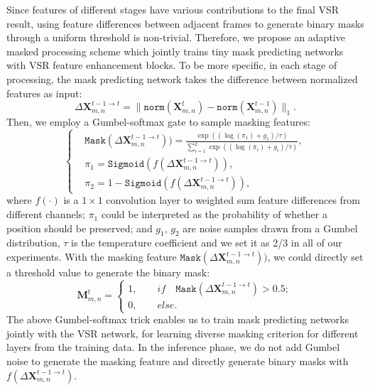 \documentclass[10pt,twocolumn,letterpaper]{article}
\begin{document}
Since features of different stages have various contributions to the final VSR result, using
feature differences between adjacent frames to generate binary masks through a uniform threshold is non-trivial.
%
Therefore, we propose an adaptive masked processing scheme which jointly trains tiny mask predicting networks with VSR feature enhancement blocks.
%
To be more specific, in each stage of processing, the mask predicting network takes  the difference between normalized features as input:
\begin{equation}\label{eq:mask}
    \Delta \bm{X}_{m,n}^{t-1\to t} = \|\texttt{norm}(\bm{X}^t_{m,n}) - \texttt{norm}(\bm{X}^{t-1}_{m,n})\|_1.
\end{equation}
Then, we employ  a Gumbel-softmax \cite{jang2016categorical} gate to sample masking features:
\begin{equation}
\left\{
    \begin{aligned}
    &\texttt{Mask}(\Delta \bm{X}_{m,n}^{t-1\to t}))=\frac{\exp \left(\left(\log \left(\pi_1\right)+g_1\right) / \tau\right)}{\sum_{i=1}^{2} \exp \left(\left(\log \left(\pi_i\right)+g_{i}\right) / \tau\right)},\\
    &\pi_1 = \texttt{Sigmoid}(f(\Delta \bm{X}_{m,n}^{t-1\to t})), \\
    &\pi_2 = 1-\texttt{Sigmoid}(f(\Delta \bm{X}_{m,n}^{t-1\to t})),
    \end{aligned}
    \right.
\end{equation}
where $f(\cdot)$ is a $1\times1$ convolution layer to weighted sum feature differences from different channels;
%
$\pi_1$ could be interpreted as the probability of whether a position should be preserved;
and  $g_1$, $g_2$ are noise samples drawn from a Gumbel distribution, $\tau$ 
 is the temperature coefficient and we set it as 2/3 in all of our experiments.
%
 With the masking feature $\texttt{Mask}(\Delta \bm{X}_{m,n}^{t-1\to t}))$, we could directly set a threshold value to generate the binary mask:
 \begin{equation}\label{eq:mask}
    \bm{M}_{m,n}^t = 
    \left\{
        \begin{array}{l}
        1,\quad\quad if \quad \texttt{Mask}(\Delta \bm{X}_{m,n}^{t-1\to t}) > 0.5; \\
        0,\quad\quad else.
        \end{array}
        \right.
\end{equation}
The above Gumbel-softmax trick enables us to train mask predicting networks jointly with the 
VSR network, 
for learning diverse masking criterion for different layers from the training data.
%
In the inference phase, we do not add Gumbel noise to generate the masking feature and directly generate binary masks with $f(\Delta \bm{X}_{m,n}^{t-1\to t})$.
\end{document}
